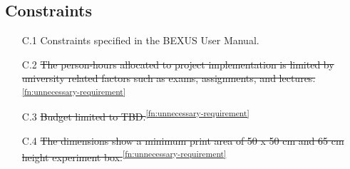 \subsection{Constraints}

\begin{enumerate}
    \item[C.1] Constraints specified in the BEXUS User Manual.
    \item[C.2] \st{The person-hours allocated to project implementation is limited by university related factors such as exams, assignments, and lectures.}\textsuperscript{\ref{fn:unnecessary-requirement}}
    \item[C.3] \st{Budget limited to TBD.}\textsuperscript{\ref{fn:unnecessary-requirement}}
    \item[C.4] \st{The dimensions show a minimum print area of 50 x 50 cm and 65 cm height experiment box.}\textsuperscript{\ref{fn:unnecessary-requirement}}
\end{enumerate}